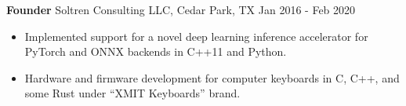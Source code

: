 \textbf{Founder}
Soltren Consulting LLC, Cedar Park, TX \hfill Jan 2016 - Feb 2020

\begin{itemize} \itemsep -2pt

\item Implemented support for a novel deep learning inference accelerator for PyTorch and ONNX backends in C++11
      and Python.

\item Hardware and firmware development for computer keyboards in C, C++, and some Rust under ``XMIT Keyboards'' brand.

\end{itemize}

